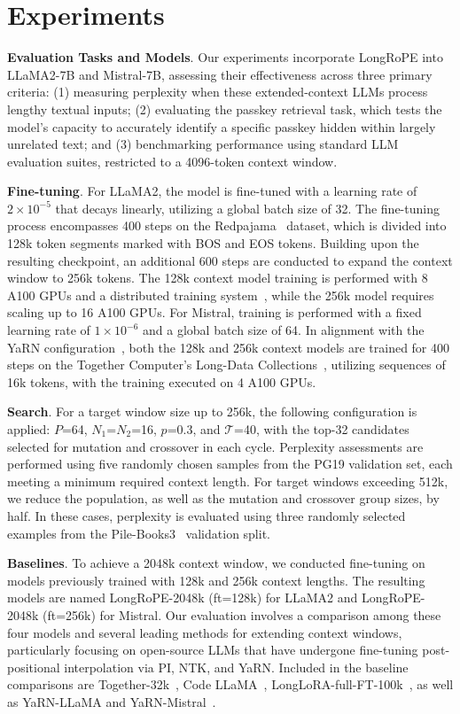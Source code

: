  \section{Experiments}

\textbf{Evaluation Tasks and Models}. Our experiments incorporate LongRoPE into LLaMA2-7B and Mistral-7B, assessing their effectiveness across three primary criteria: (1) measuring perplexity when these extended-context LLMs process lengthy textual inputs; (2) evaluating the passkey retrieval task, which tests the model’s capacity to accurately identify a specific passkey hidden within largely unrelated text; and (3) benchmarking performance using standard LLM evaluation suites, restricted to a 4096-token context window.

\textbf{Fine-tuning}. For LLaMA2, the model is fine-tuned with a learning rate of $2 \times 10^{-5}$ that decays linearly, utilizing a global batch size of 32. The fine-tuning process encompasses 400 steps on the Redpajama~\cite{redpajama} dataset, which is divided into 128k token segments marked with BOS and EOS tokens. Building upon the resulting checkpoint, an additional 600 steps are conducted to expand the context window to 256k tokens. The 128k context model training is performed with 8 A100 GPUs and a distributed training system~\cite{cube}, while the 256k model requires scaling up to 16 A100 GPUs. For Mistral, training is performed with a fixed learning rate of $1 \times 10^{-6}$ and a global batch size of 64. In alignment with the YaRN configuration~\cite{yarn}, both the 128k and 256k context models are trained for 400 steps on the Together Computer’s Long-Data Collections~\cite{mistraldata}, utilizing sequences of 16k tokens, with the training executed on 4 A100 GPUs.

\textbf{Search}. For a target window size up to 256k, the following configuration is applied: $P$=64, $N_1$=$N_2$=16, $p$=0.3, and $\mathcal{T}$=40, with the top-32 candidates selected for mutation and crossover in each cycle. Perplexity assessments are performed using five randomly chosen samples from the PG19 validation set, each meeting a minimum required context length. For target windows exceeding 512k, we reduce the population, as well as the mutation and crossover group sizes, by half. In these cases, perplexity is evaluated using three randomly selected examples from the Pile-Books3~\cite{pile} validation split.

\textbf{Baselines}. To achieve a 2048k context window, we conducted fine-tuning on models previously trained with 128k and 256k context lengths. The resulting models are named LongRoPE-2048k (ft=128k) for LLaMA2 and LongRoPE-2048k (ft=256k) for Mistral. Our evaluation involves a comparison among these four models and several leading methods for extending context windows, particularly focusing on open-source LLMs that have undergone fine-tuning post-positional interpolation via PI, NTK, and YaRN. Included in the baseline comparisons are Together-32k~\cite{together}, Code LLaMA~\cite{codellama}, LongLoRA-full-FT-100k~\cite{longlora}, as well as YaRN-LLaMA and YaRN-Mistral~\cite{yarn}.

